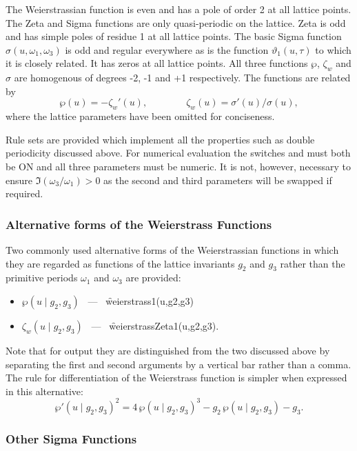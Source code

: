 The Weierstrassian function is even and has a pole of order 2 at all lattice points.
The Zeta and Sigma functions are only quasi-periodic on the lattice. Zeta is odd and has simple poles of residue
1 at all lattice points. The basic Sigma function $\sigma(u,\omega_1,\omega_3)$ is odd and regular everywhere as is
the function $\vartheta_1(u,\tau)$ to which it is closely related. It has zeros at all lattice points. All three functions
$\wp$, $\zeta_w$ and $\sigma$ are homogenous of degrees -2, -1 and +1 respectively. The functions are related by
\[ \wp(u) = -\zeta_w'(u),\qquad\qquad \zeta_w(u) = \sigma'(u)/\sigma(u),\]
where the lattice parameters have been omitted for conciseness.

Rule sets are provided which implement all the properties such as double periodicity discussed above. For numerical evaluation
the switches  and  must both be ON and all three parameters must be numeric. It is not, however,
necessary to ensure $\Im(\omega_3/\omega_1) >0$ as the second and third parameters will be swapped if required.

\subsubsection{Alternative forms of the Weierstrass Functions}
\hypertarget{WEIERSTRASS1}{}
\hypertarget{WEIERSTRASSZETA1}{}
\hypertarget{operator:WEIERSTRASS1}{}
\hypertarget{operator:WEIERSTRASSZETA1}{}
 

Two commonly used alternative forms of the Weierstrassian functions in which
they are regarded as functions of the lattice invariants $g_2$ and $g_3$
rather than the primitive periods $\omega_1$ and $\omega_3$ are provided:
\begin{itemize}
\item  $\wp(u \mid g_2, g_3)$ \ --- \ \f{weierstrass1(u,g2,g3)}
\item $\zeta_w(u \mid g_2, g_3)$ \ --- \ \f{weierstrassZeta1(u,g2,g3)}.
\end{itemize}
Note that for output they are distinguished from the two discussed above
by separating the first and
second arguments by a vertical bar rather than a comma. The rule for
differentiation of the Weierstrass function is simpler when expressed in
this  alternative:
\[ \wp'(u \mid g_2,g_3)^2 = 4\,\wp(u \mid g_2,g_3)^3
   - g_2\, \wp(u \mid g_2,g_3) -g_3. \]

\subsubsection{Other Sigma Functions}
\hypertarget{SIGMA1}{}
\hypertarget{operator:WEIERSTRASS_SIGMA1}{}
\hypertarget{operator:WEIERSTRASS_SIGMA2}{}
\hypertarget{operator:WEIERSTRASS_SIGMA3}{}

